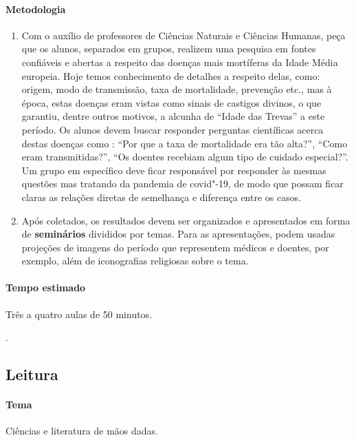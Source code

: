 \documentclass[12pt]{extarticle}
\begin{document}
 \paragraph{Metodologia}
 	\begin{enumerate}
 		\item
 		Com o auxílio de professores de Ciências Naturais e Ciências Humanas,
 		peça que os alunos, separados em grupos, realizem uma pesquisa em fontes confiáveis
 		e abertas a respeito das doenças mais mortíferas da Idade Média europeia. 
 		Hoje temos conhecimento de detalhes a respeito delas, como: origem, modo
 		de transmissão, taxa de mortalidade, prevenção etc., mas à época, estas
 		doenças eram vistas como sinais de castigos divinos, o que garantiu, dentre outros
 		motivos, a alcunha de ``Idade das Trevas'' a este período. Os alunos devem 
 		buscar responder perguntas científicas acerca destas doenças como : ``Por que
 		a taxa de mortalidade era tão alta?'', ``Como eram transmitidas?'', ``Os doentes
 		recebiam algum tipo de cuidado especial?''. Um grupo em específico deve
 		ficar responsável por responder às mesmas questões mas tratando da pandemia
 		de covid"-19, de modo que possam ficar claras as relações diretas de semelhança
 		e diferença entre os casos.
 		\item
 		Após coletados, os resultados devem ser organizados e apresentados em forma 
 		de \textbf{seminários} divididos por temas. Para as apresentações, podem usadas
 		projeções de imagens do período que representem médicos e doentes, por exemplo,
 		além de iconografias religiosas sobre o tema.
 	\end{enumerate}

 \paragraph{Tempo estimado} Três a quatro aulas de 50 minutos.

.


\subsection{Leitura}

 \paragraph{Tema} Ciências e literatura de mãos dadas.
\end{document}
